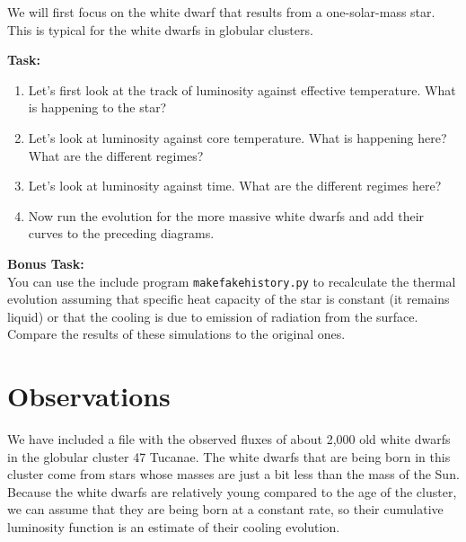 \documentclass{article}
\begin{document}
We will first focus on the white dwarf that results from a one-solar-mass star.  This is typical for the white dwarfs in globular clusters.

\textbf{Task:}\vspace{-1em}
\begin{enumerate}
 \setlength\itemsep{0em}
\item Let's first look at the track of luminosity against effective temperature.  What is happening to the star?
\item Let's look at luminosity against core temperature.  What is happening here?  What are the different regimes?
\item Let's look at luminosity against time.  What are the different regimes here?
\item 
Now run the evolution for the more massive white dwarfs and add their curves to the preceding diagrams.
\end{enumerate}


\textbf{Bonus Task:}\\
You can use the include program \texttt{makefakehistory.py} to recalculate the thermal evolution assuming that specific heat capacity of the star is constant (it remains liquid) or that the cooling is due to emission of radiation from the surface.  Compare the results of these simulations to the original ones.

\section{Observations}

We have included a file with the observed fluxes of about 2,000 old white dwarfs in the globular cluster 47 Tucanae.  The white dwarfs that are being born in this cluster come from stars whose masses are just a bit less than the mass of the Sun.   Because the white dwarfs are relatively young compared to the age of the cluster, we can assume that they are being born at a constant rate, so their cumulative luminosity function is an estimate of their cooling evolution.
\end{document}

